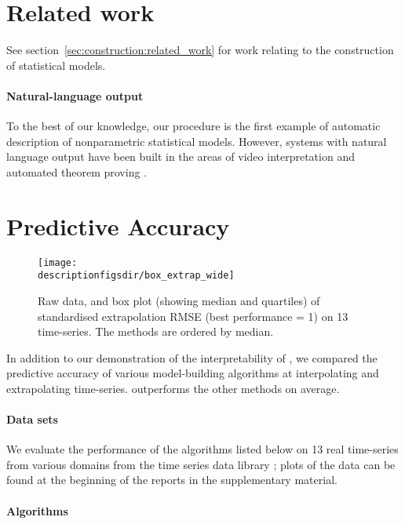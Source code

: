 \section{Related work}
\label{sec:related-work}

See section~\ref{sec:construction:related_work} for work relating to the construction of statistical models.

\paragraph{Natural-language output}
To the best of our knowledge, our procedure is the first example of automatic description of nonparametric statistical models.
However, systems with natural language output have been built in the areas of video interpretation \citep{Barbu2012-wv} and automated theorem proving \citep{Ganesalingam_undated-us}.

\section{Predictive Accuracy}
\label{sec:numerical}

\begin{figure*}[ht]
\centering
\texttt{[image: \\descriptionfigsdir/box\_extrap\_wide]}
\vspace{-0.8cm}
\caption{
Raw data, and box plot (showing median and quartiles) of standardised extrapolation RMSE (best performance = 1) on 13 time-series.
The methods are ordered by median.
}
\label{fig:box_extrap_dist}
\end{figure*}

In addition to our demonstration of the interpretability of \procedurename{}, we compared the predictive accuracy of various model-building algorithms at interpolating and extrapolating time-series.
\procedurename{} outperforms the other methods on average.

\paragraph{Data sets}

We evaluate the performance of the algorithms listed below on 13 real time-series from various domains from the time series data library \citep{TSDL}; plots of the data can be found at the beginning of the reports in the supplementary material.

\paragraph{Algorithms}

